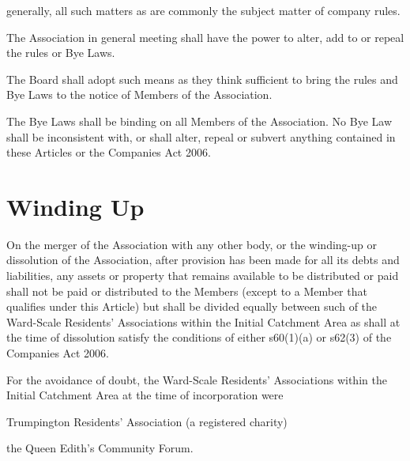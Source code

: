 \documentclass[10pt]{mk-articles-of-association}
\newcommand{\EC}[0]{Board}
\newcommand{\Exec}[0]{\EC{} }
\newcommand{\WSRA}[0]{Ward-Scale Residents' Association}
\begin{document}
\begin{constenum}
\begin{constenum}
\item generally, all such matters as are commonly the subject matter
  of company rules.

\end{constenum}

\item The Association in general meeting shall have the power to
  alter, add to or repeal the rules or Bye Laws.

\item The \Exec shall adopt such means as they think sufficient to
  bring the rules and Bye Laws to the notice of Members of the Association.

\item The Bye Laws shall be binding on all Members of the
  Association. No Bye Law shall be inconsistent with, or shall
  alter, repeal or subvert anything contained in these Articles or
  the Companies Act 2006.
\end{constenum}



\section{Winding Up}

\begin{constenum}

\item On the merger of the Association with any other body, or the
  winding-up or dissolution of the Association, after provision has
  been made for all its debts and liabilities, any assets or property
  that remains available to be distributed or paid shall not be paid
  or distributed to the Members (except to a Member that qualifies
  under this Article) but shall be divided equally between such of the
  \WSRA{}s within the Initial Catchment Area as shall at the time of
  dissolution satisfy the conditions of either s60(1)(a) or s62(3)
  of the Companies Act 2006.

\item For the avoidance of doubt, the \WSRA{}s within the Initial
  Catchment Area at the time of incorporation were
  \begin{constenum}
    \item Trumpington Residents' Association (a registered charity) \ITand
    \item the Queen Edith's Community Forum.
  \end{constenum}

\end{constenum}
\end{document}

